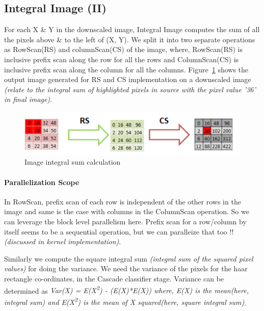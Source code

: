 \subsection{Integral Image (II)}\label{sec:II}

For each X  \& Y in the downscaled image, Integral Image computes 
the sum of all the pixels above \& to the left of (X, Y).  We split 
it into two separate operations as RowScan(RS) and columnScan(CS) of the 
image, where, RowScan(RS) is inclusive prefix scan along the row for all 
the rows and ColumnScan(CS) is inclusive prefix scan along the column for all the columns.
Figure~\ref{fig:II} shows the output image generated for RS and CS implementation 
on a downscaled image
\textit{(relate to the integral sum of highlighted pixels in source with the pixel value '36' in final image)}.

\begin{figure}[h]
  \centering
  \includegraphics[width=\linewidth]{figs/ii_img_crop.pdf}
  \caption{Image integral sum calculation }
  \label{fig:II}
\end{figure}



\paragraph{Parallelization Scope}
In RowScan, prefix scan of each row is independent of the other rows 
in the image and same is the case with columns in the ColumnScan operation. 
So we can leverage the block level parallelism here. Prefix scan for a row/column  
by itself seems to be a sequential operation, but we can paralleize that too !!
\textit{(discussed in kernel implementation)}.

Similarly we compute the square integral sum \textit{(integral sum of the squared pixel values)}
for doing the variance. We need the variance of the pixels for the haar rectangle co-ordinates, 
in the Cascade classifier stage. Variance can be determined 
as \textit{Var(X) = E(X\textsuperscript{2}) - (E(X)*E(X))
where, E(X) is the mean(here, integral sum) 
and E(X\textsuperscript{2}) is the mean of X squared(here, square integral sum)}.



